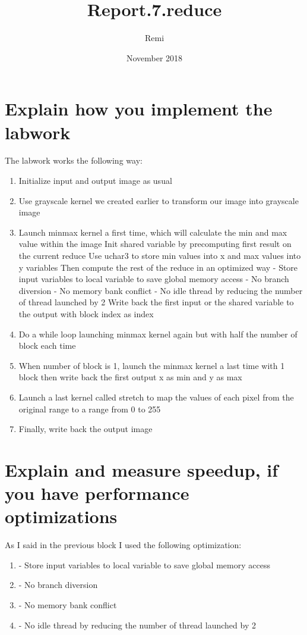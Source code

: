 \documentclass{article}
\title{Report.7.reduce}
\author{Remi}
\date{November 2018}
\begin{document}
\maketitle

\section{Explain how you implement the labwork}

The labwork works the following way:
\begin{enumerate}  
\item Initialize input and output image as usual
\item Use grayscale kernel we created earlier to transform our image into grayscale image
\item Launch minmax kernel a first time, which will calculate the min and max value within the image
    \subitem Init shared variable by precomputing first result on the current reduce
    \subitem Use uchar3 to store min values into x and max values into y variables
    \subitem Then compute the rest of the reduce in an optimized way
        \subsubitem - Store input variables to local variable to save global memory access
        \subsubitem - No branch diversion
        \subsubitem - No memory bank conflict
        \subsubitem - No idle thread by reducing the number of thread launched by 2
    \subitem Write back the first input or the shared variable to the output with block index as index
\item Do a while loop launching minmax kernel again but with half the number of block each time
\item When number of block is 1, launch the minmax kernel a last time with 1 block then write back the first output x as min and y as max
\item Launch a last kernel called stretch to map the values of each pixel from the original range to a range from 0 to 255
\item Finally, write back the output image
\end{enumerate}

\section{Explain and measure speedup, if you have performance optimizations}
As I said in the previous block I used the following optimization:
\begin{enumerate}  
\item - Store input variables to local variable to save global memory access
\item - No branch diversion
\item - No memory bank conflict
\item - No idle thread by reducing the number of thread launched by 2
\end{enumerate}
\end{document}
